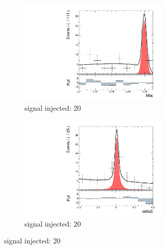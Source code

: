 \begin{figure}[htpb]
	\ContinuedFloat
	\begin{subfigure}{0.5\linewidth}
		\includegraphics[page=1,height=5cm]{figures/injection_sig_20/ds_gen_Mbc_2D.pdf}
		\caption{signal injected: 20}
	\end{subfigure}
	\begin{subfigure}{0.5\linewidth}
		\includegraphics[page=1,height=5cm]{figures/injection_sig_20/ds_gen_deltaE_2D.pdf}
		\caption{signal injected: 20}
	\end{subfigure}
	

\end{figure}

